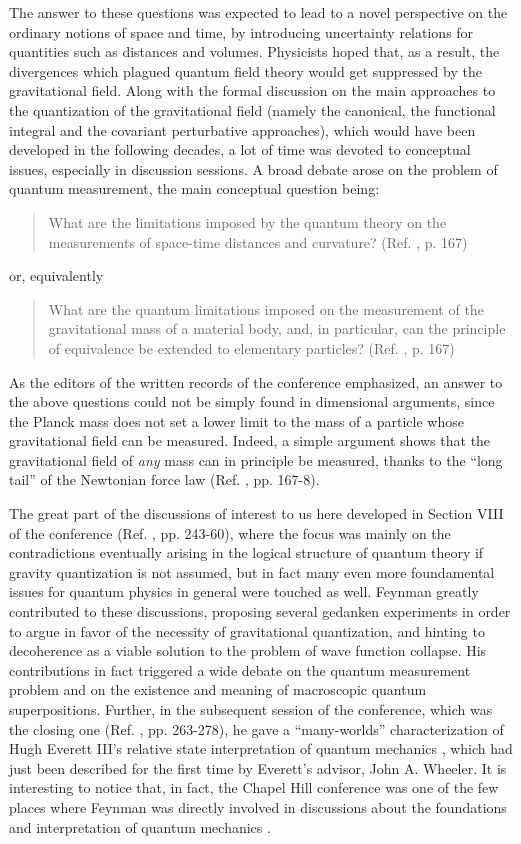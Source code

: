 \documentclass{ws-procs961x669}            %
\begin{document}
%
The answer to these questions was expected to lead to a novel
perspective on the ordinary notions of space and time, by
introducing uncertainty relations for quantities such as distances
and volumes. Physicists hoped that, as a result, the divergences
which plagued quantum field theory would get suppressed by the
gravitational field. Along with the formal discussion on the main
approaches to the quantization of the gravitational field (namely
the canonical, the functional integral and the covariant
perturbative approaches), which would have been developed in the
following decades, a lot of time was devoted to conceptual issues,
especially in discussion sessions. A broad debate arose on the
problem of quantum measurement, the main conceptual question
being:
%
\begin{quote}
What are the limitations imposed by the quantum theory on the
measurements of space-time distances and curvature? (Ref.
, p. 167)
\end{quote}
%
or, equivalently
%
\begin{quote}
What are the quantum limitations imposed on the measurement of the
gravitational mass of a material body, and, in particular, can the
principle of equivalence be extended to elementary particles?
(Ref. , p. 167)
\end{quote}
%
As the editors of the written records of the
conference\cite{ChapelHill} emphasized, an answer to the above
questions could not be simply found in dimensional arguments,
since the Planck mass does not set a lower limit to the mass of a
particle whose gravitational field can be measured. Indeed, a
simple argument shows that the gravitational field of \emph{any}
mass can in principle be measured, thanks to the ``long tail'' of
the Newtonian force law (Ref. , pp. 167-8).

The great part of the discussions of interest to us here developed
in Section VIII of the conference (Ref. , pp.
243-60), where the focus was mainly on the contradictions
eventually arising in the logical structure of quantum theory if
gravity quantization is not assumed, but in fact many even more
foundamental issues for quantum physics in general were touched as
well. Feynman greatly contributed to these discussions, proposing
several gedanken experiments in order to argue in favor of the
necessity of gravitational quantization, and hinting to
decoherence as a viable solution to the problem of wave function
collapse. His contributions in fact triggered a wide debate on the
quantum measurement problem and on the existence and meaning of
macroscopic quantum superpositions. Further, in the subsequent
session of the conference, which was the closing one (Ref.
, pp. 263-278), he gave a ``many-worlds''
characterization of Hugh Everett III's relative state
interpretation of quantum mechanics \cite{Everett}, which had just
been described for the first time by Everett's advisor, John A.
Wheeler. It is interesting to notice that, in fact, the Chapel
Hill conference was one of the few places where Feynman was
directly involved in discussions about the foundations and
interpretation of quantum mechanics \cite{Zeh}.
\end{document}
